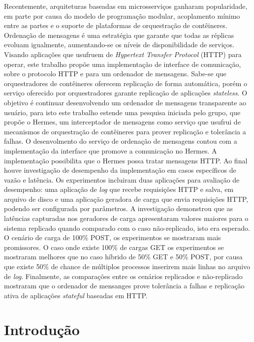 \documentclass[12pt]{article}
\begin{document}
\begin{resumo} 
Recentemente, arquiteturas baseadas em microsserviços ganharam popularidade, em parte por causa do modelo de programação modular, acoplamento mínimo entre as partes e o suporte de plataformas de orquestração de contêineres. Ordenação de mensagens é uma estratégia que garante que todas as réplicas evoluam igualmente, aumentando-se os níveis de disponibilidade de serviços. Visando aplicações que usufruem de \textit{Hypertext Transfer Protocol} (HTTP) para operar, este trabalho propõe uma implementação de interface de comunicação, sobre o protocolo HTTP e para um ordenador de mensagens. Sabe-se que orquestradores de contêineres oferecem replicação de forma automática, porém o serviço oferecido por orquestradores garante replicação de aplicações \textit{stateless}. O objetivo é continuar desenvolvendo um ordenador de mensagens transparente ao usuário, para isto este trabalho estende uma pesquisa iniciada pelo grupo, que propõe o Hermes, um interceptador de mensagens como serviço que usufrui de mecanismos de orquestração de contêineres para prover replicação e tolerância a falhas. O desenvolmento do serviço de ordenação de mensagens contou com a implementação da interface que promove a comunicação no Hermes. A implementação possibilita que o Hermes possa tratar mensagens {HTTP}. Ao final houve investigação de desempenho da implementação em casos específicos de vazão e latência. Os experimentos incluiram duas aplicações para avaliação de desempenho: uma aplicação de \textit{log} que recebe requisições HTTP e salva, em arquivo de disco e uma aplicação geradora de carga que envia requisições HTTP, podendo ser configurada por parâmetros. A investigação demonstrou que as latências capturadas nos geradores de carga apresentaram valores maiores para o sistema replicado quando comparado com o caso não-replicado, isto era esperado. O cenário de carga de 100\% POST, os experimentos se mostraram mais promissores. O caso onde existe 100\% de cargas GET os experimentos se mostraram melhores que no caso híbrido de 50\% GET e 50\% POST, por causa que existe 50\% de chance de múltiplos processos inserirem mais linhas no arquivo de \textit{log}. Finalmente, as comparações entre os cenários replicados e não-replicado mostraram que o ordenador de mensanges prove tolerância a falhas e replicação ativa de aplicações \textit{stateful} baseadas em HTTP.
\end{resumo}

\section{Introdução}
\end{document}
